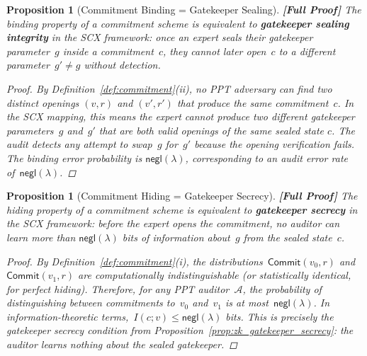 \documentclass[12pt,a4paper]{article}
\newtheorem{proposition}[theorem]{Proposition}
\theoremstyle{remark}
\newcommand{\A}{\mathcal{A}}
\newcommand{\SCX}{\textsf{SCX}}
\newcommand{\Commit}{\textsf{Commit}}
\newcommand{\negl}{\textsf{negl}}
\newcommand{\rigorFull}{\textbf{[Full Proof]}}
\begin{document}
\begin{proposition}[Commitment Binding = Gatekeeper Sealing]
\label{prop:binding_sealing}
\rigorFull
The binding property of a commitment scheme is equivalent to \textbf{gatekeeper sealing integrity} in the \SCX{} framework: once an expert seals their gatekeeper parameter~$g$ inside a commitment~$c$, they cannot later open~$c$ to a different parameter~$g' \neq g$ without detection.

\begin{proof}
By Definition~\ref{def:commitment}(ii), no PPT adversary can find two distinct openings $(v, r)$ and $(v', r')$ that produce the same commitment~$c$. In the \SCX{} mapping, this means the expert cannot produce two different gatekeeper parameters~$g$ and~$g'$ that are both valid openings of the same sealed state $c$. The audit detects any attempt to swap~$g$ for~$g'$ because the opening verification fails. The binding error probability is $\negl(\lambda)$, corresponding to an audit error rate of~$\negl(\lambda)$.
\end{proof}
\end{proposition}

\begin{proposition}[Commitment Hiding = Gatekeeper Secrecy]
\label{prop:hiding_secrecy}
\rigorFull
The hiding property of a commitment scheme is equivalent to \textbf{gatekeeper secrecy} in the \SCX{} framework: before the expert opens the commitment, no auditor can learn more than $\negl(\lambda)$ bits of information about~$g$ from the sealed state~$c$.

\begin{proof}
By Definition~\ref{def:commitment}(i), the distributions~$\Commit(v_0, r)$ and~$\Commit(v_1, r)$ are computationally indistinguishable (or statistically identical, for perfect hiding). Therefore, for any PPT auditor~$\A$, the probability of distinguishing between commitments to~$v_0$ and~$v_1$ is at most~$\negl(\lambda)$. In information-theoretic terms,~$I(c; v) \leq \negl(\lambda)$ bits. This is precisely the gatekeeper secrecy condition from Proposition~\ref{prop:zk_gatekeeper_secrecy}: the auditor learns nothing about the sealed gatekeeper.
\end{proof}
\end{proposition}
\end{document}
